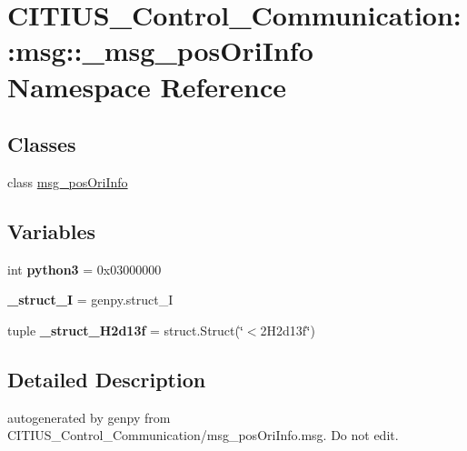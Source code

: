 \hypertarget{namespace_c_i_t_i_u_s___control___communication_1_1msg_1_1__msg__pos_ori_info}{\section{\-C\-I\-T\-I\-U\-S\-\_\-\-Control\-\_\-\-Communication\-:\-:msg\-:\-:\-\_\-msg\-\_\-pos\-Ori\-Info \-Namespace \-Reference}
\label{namespace_c_i_t_i_u_s___control___communication_1_1msg_1_1__msg__pos_ori_info}
}
\subsection*{\-Classes}
\begin{DoxyCompactItemize}
\item 
class \hyperlink{class_c_i_t_i_u_s___control___communication_1_1msg_1_1__msg__pos_ori_info_1_1msg__pos_ori_info}{msg\-\_\-pos\-Ori\-Info}
\end{DoxyCompactItemize}
\subsection*{\-Variables}
\begin{DoxyCompactItemize}
\item 
\hypertarget{namespace_c_i_t_i_u_s___control___communication_1_1msg_1_1__msg__pos_ori_info_a0a09a002e25cb2d607037162dac76b1a}{int {\bfseries python3} = 0x03000000}\label{namespace_c_i_t_i_u_s___control___communication_1_1msg_1_1__msg__pos_ori_info_a0a09a002e25cb2d607037162dac76b1a}

\item 
\hypertarget{namespace_c_i_t_i_u_s___control___communication_1_1msg_1_1__msg__pos_ori_info_a24ce549004ccf9172b0faffe7a93fb8b}{{\bfseries \-\_\-struct\-\_\-\-I} = genpy.\-struct\-\_\-\-I}\label{namespace_c_i_t_i_u_s___control___communication_1_1msg_1_1__msg__pos_ori_info_a24ce549004ccf9172b0faffe7a93fb8b}

\item 
\hypertarget{namespace_c_i_t_i_u_s___control___communication_1_1msg_1_1__msg__pos_ori_info_a17fb7b24c28cf23a64b9031124c1917b}{tuple {\bfseries \-\_\-struct\-\_\-H2d13f} = struct.\-Struct(\char`\"{}$<$2\-H2d13f\char`\"{})}\label{namespace_c_i_t_i_u_s___control___communication_1_1msg_1_1__msg__pos_ori_info_a17fb7b24c28cf23a64b9031124c1917b}

\end{DoxyCompactItemize}


\subsection{\-Detailed \-Description}
\begin{DoxyVerb}autogenerated by genpy from CITIUS_Control_Communication/msg_posOriInfo.msg. Do not edit.\end{DoxyVerb}
 